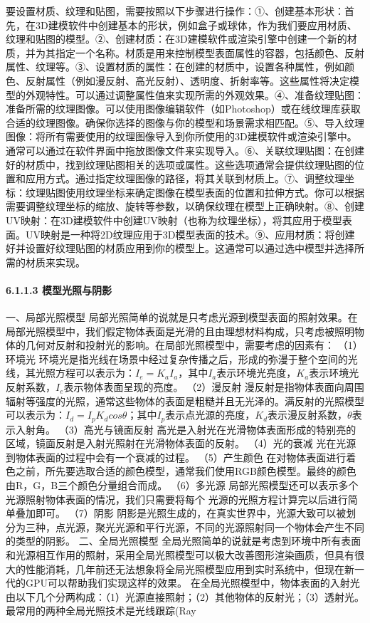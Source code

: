 要设置材质、纹理和贴图，需要按照以下步骤进行操作：①、创建基本形状：首先，在3D建模软件中创建基本的形状，例如盒子或球体，作为我们要应用材质、纹理和贴图的模型。②、创建材质：在3D建模软件或渲染引擎中创建一个新的材质，并为其指定一个名称。材质是用来控制模型表面属性的容器，包括颜色、反射属性、纹理等。③、设置材质的属性：在创建的材质中，设置各种属性，例如颜色、反射属性（例如漫反射、高光反射）、透明度、折射率等。这些属性将决定模型的外观特性。可以通过调整属性值来实现所需的外观效果。④、准备纹理贴图：准备所需的纹理图像。可以使用图像编辑软件（如Photoshop）或在线纹理库获取合适的纹理图像。确保你选择的图像与你的模型和场景需求相匹配。⑤、导入纹理图像：将所有需要使用的纹理图像导入到你所使用的3D建模软件或渲染引擎中。通常可以通过在软件界面中拖放图像文件来实现导入。⑥、关联纹理贴图：在创建好的材质中，找到纹理贴图相关的选项或属性。这些选项通常会提供纹理贴图的位置和应用方式。通过指定纹理图像的路径，将其关联到材质上。⑦、调整纹理坐标：纹理贴图使用纹理坐标来确定图像在模型表面的位置和拉伸方式。你可以根据需要调整纹理坐标的缩放、旋转等参数，以确保纹理在模型上正确映射。⑧、创建UV映射：在3D建模软件中创建UV映射（也称为纹理坐标），将其应用于模型表面。UV映射是一种将2D纹理应用于3D模型表面的技术。⑨、应用材质：将创建好并设置好纹理贴图的材质应用到你的模型上。这通常可以通过选中模型并选择所需的材质来实现。 \paragraph{6.1.1.3 模型光照与阴影}\label{ux6a21ux578bux5149ux7167ux4e0eux9634ux5f71} 一、局部光照模型 局部光照简单的说就是只考虑光源到模型表面的照射效果。在局部光照模型中，我们假定物体表面是光滑的且由理想材料构成，只考虑被照明物体的几何对反射和投射光的影响。在局部光照模型中，需要考虑的因素有： （1）环境光 环境光是指光线在场景中经过复杂传播之后，形成的弥漫于整个空间的光线，其光照方程可以表示为：\(I_e=K_aI_a\)，其中\(I_a\)表示环境光亮度，\(K_a\)表示环境光反射系数，\(I_e\)表示物体表面呈现的亮度。 （2）漫反射 漫反射是指物体表面向周围辐射等强度的光照，通常这些物体的表面是粗糙并且无光泽的。满反射的光照模型可以表示为：\(I_d=I_pK_d cos \theta\)；其中\(I_p\)表示点光源的亮度，\(K_d\)表示漫反射系数，\(\theta\)表示入射角。 （3）高光与镜面反射 高光是入射光在光滑物体表面形成的特别亮的区域，镜面反射是入射光照射在光滑物体表面的反射。 （4）光的衰减 光在光源到物体表面的过程中会有一个衰减的过程。 （5）产生颜色 在对物体表面进行着色之前，所先要选取合适的颜色模型，通常我们使用RGB颜色模型。最终的颜色由R，G，B三个颜色分量组合而成。 （6）多光源 局部光照模型还可以表示多个光源照射物体表面的情况，我们只需要将每个 光源的光照方程计算完以后进行简单叠加即可。 （7）阴影 阴影是光照生成的，在真实世界中，光源大致可以被划分为三种，点光源，聚光光源和平行光源，不同的光源照射同一个物体会产生不同的类型的阴影。 二、全局光照模型 全局光照简单的说就是考虑到环境中所有表面和光源相互作用的照射，采用全局光照模型可以极大改善图形渲染画质，但具有很大的性能消耗，几年前还无法想象将全局光照模型应用到实时系统中，但现在新一代的GPU可以帮助我们实现这样的效果。 在全局光照模型中，物体表面的入射光由以下几个分两构成：（1）光源直接照射；（2）其他物体的反射光；（3）透射光。最常用的两种全局光照技术是光线跟踪(Ray 